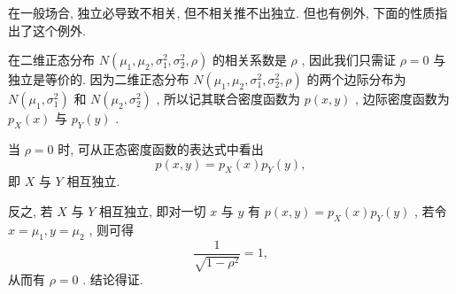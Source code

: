 	在一般场合, 独立必导致不相关, 但不相关推不出独立. 但也有例外, 下面的性质指出了这个例外.
	\begin{property}\label{pro:3.4.13}
		在二维正态分布 $N(\mu_1,\mu_2,\sigma_1^2,\sigma_2^2,\rho)$ 的相关系数是 $\rho$ , 因此我们只需证 $\rho=0$ 与独立是等价的. 因为二维正态分布 $N(\mu_1,\mu_2,\sigma_1^2,\sigma_2^2,\rho)$ 的两个边际分布为 $N(\mu_1,\sigma_1^2)$ 和 $N(\mu_2,\sigma_2^2)$ , 所以记其联合密度函数为 $p(x,y)$ , 边际密度函数为 $p_{X}(x)$ 与 $p_{Y}(y)$ .

		当 $\rho=0$ 时, 可从正态密度函数的表达式中看出
		\begin{equation*}
			p(x,y)=p_{X}(x)p_{Y}(y),
		\end{equation*}
		即 $X$ 与 $Y$ 相互独立.

		反之, 若 $X$ 与 $Y$ 相互独立, 即对一切 $x$ 与 $y$ 有 $p(x,y)=p_{X}(x)p_{Y}(y)$ , 若令 $x=\mu_1,y=\mu_2$ , 则可得
		\begin{equation*}
			\frac{1}{\sqrt{1-\rho^2}}=1,
		\end{equation*}
		从而有 $\rho=0$ . 结论得证.
	\end{property}
